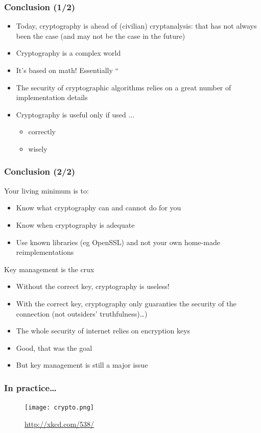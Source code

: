 \documentclass[
hyperref={pdfpagelabels=false}
,xcolor=table
]
{beamer}
\begin{document}
\begin{frame}
  \frametitle{Conclusion (1/2)}
  \begin{block}{}
    \begin{itemize}
    \item Today, cryptography is ahead of (civilian) cryptanalysis: that has not always been the case (and may not be the case in the future)
    \item Cryptography is a complex world
    \item It's based on math! Essentially ``
    \item The security of cryptographic algorithms relies on a great number of implementation details
    \item Cryptography is useful only if used ...
      \begin{itemize}
      \item correctly
      \item wisely
      \end{itemize}
    \end{itemize}	
  \end{block}
\end{frame}


\begin{frame}
  \frametitle{Conclusion (2/2)}
\begin{block}{Your living minimum is to: }
	\begin{itemize}
		\item Know what cryptography can and cannot do for you
		\item Know when cryptography is adequate
		\item Use known libraries (eg OpenSSL) and not your own home-made reimplementations
	\end{itemize}	
\end{block}

\begin{block}{Key management is the crux}
	\begin{itemize}
		\item Without the correct key, cryptography is useless!
		\item With the correct key, cryptography only guaranties the security of the connection (not outsiders' truthfulness)\ldots)
	\end{itemize}
\end{block}

\begin{block}{}
  \begin{itemize}
  \item The whole security of internet relies on encryption keys
  \item Good, that was the goal
  \item But key management is still a major issue
  \end{itemize}
\end{block}
\end{frame}



\begin{frame}
  \frametitle{In practice\ldots}
  \begin{figure}
	\centering
	\texttt{[image: crypto.png]}
	
	\url{http://xkcd.com/538/}
  \end{figure}
\end{frame}
\end{document}
